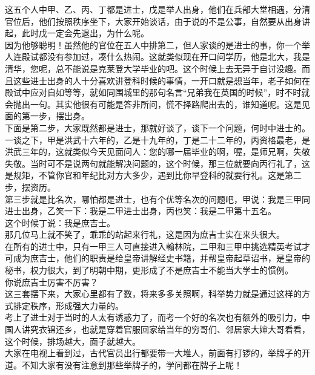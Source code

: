 \begin{multicols}{\theparacolNo}
这五个人中甲、乙、丙、丁都是进士，戊是举人出身，他们在兵部大堂相遇，分清官位后，他们按照秩序坐下，大家开始谈话，由于说的不是公事，自然要从出身讲起，此时戊一定会先退出，为什么呢。\\

因为他够聪明！虽然他的官位在五人中排第二，但人家谈的是进士的事，你一个举人连殿试都没有参加过，凑什么热闹。这就类似现在开口问学历，他是北大，我是清华，您呢，总不能说是克莱登大学毕业的吧。这个时候上去无异于自讨没趣。而且这些进士出身的人十分喜欢讲登科时候的事情，一开口就是想当年，老子如何在殿试中应对自如等等，就如同围城里的那句名言“兄弟我在英国的时候”，时不时就会抛出一句。其实他很有可能是答非所问，慌不择路爬出去的，谁知道呢。这是见面的第一步，摆出身。\\

下面是第二步，大家既然都是进士，那就好谈了，谈下一个问题，何时中进士的。一谈之下，甲是洪武十六年的，乙是十九年的，丁是二十二年的，丙资格最老，是洪武三年的，这就类似今天见面问人：您的哪一届毕业的啊，喔，是师兄啊，失敬失敬。当时可不是说两句就能解决问题的，这个时候，那三位就要向丙行礼了，这是规矩，不管你官和年纪比对方大多少，遇到比你早登科的就要行礼。这是第二步，摆资历。\\

第三步就是比名次，哪怕都是进士，也有个优等名次的问题吧，甲说：我是三甲同进士出身，乙笑一下：我是二甲进士出身，丙也笑：我是二甲第十五名。\\

这个时候丁说：我是庶吉士。\\

那几位马上就不笑了，乖乖的站起来行礼，这是因为庶吉士实在来头很大。\\

在所有的进士中，只有一甲三人可直接进入翰林院，二甲和三甲中挑选精英考试才可成为庶吉士，他们的职责是给皇帝讲解经史书籍，并帮皇帝起草诏书，是皇帝的秘书，权力很大，到了明朝中期，更形成了不是庶吉士不能当大学士的惯例。\\

你说庶吉士厉害不厉害？\\

这三套摆下来，大家心里都有了数，将来多多关照啊，科举势力就是通过这样的方式排定秩序，形成强大力量的。\\

考上了进士对于当时的人太有诱惑力了，而考一个好的名次也有额外的吸引力，中国人讲究衣锦还乡，也就是穿着官服回家给当年的穷哥们、邻居家大婶大哥看看，这个时候，排场越大，面子就越大。\\

大家在电视上看到过，古代官员出行都要带一大堆人，前面有打锣的，举牌子的开道。不知大家有没有注意到那些举牌子的，学问都在牌子上呢！\\


\end{multicols}

